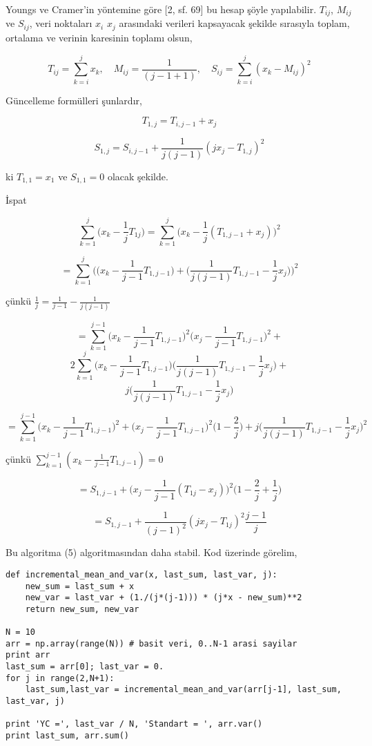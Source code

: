 \documentclass[12pt,fleqn]{article}\usepackage{../../common}
\begin{document}
Youngs ve Cramer'in yöntemine göre [2, sf. 69] bu hesap şöyle
yapılabilir. $T_{ij}$, $M_{ij}$ ve $S_{ij}$, veri noktaları $x_i$ $x_j$
arasındaki verileri kapsayacak şekilde sırasıyla toplam, ortalama ve verinin
karesinin toplamı olsun,

$$ 
T_{ij} = \sum _{k=i}^{j} x_k , \quad  
M_{ij} = \frac{1}{(j-1+1)}, \quad
S_{ij} = \sum _{k=i}^{j} (x_k - M_{ij})^2
$$

Güncelleme formülleri şunlardır, 

$$ T_{1,j} = T_{i,j-1} + x_j$$

$$ S_{1,j} = S_{i,j-1} + \frac{1}{j(j-1)} (jx_j - T_{1,j})^2  $$

ki $T_{1,1} = x_1$ ve $S_{1,1}=0$ olacak şekilde.

İspat

$$ 
\sum _{k=1}^{j} \bigg( x_k - \frac{1}{j} T_{1j} \bigg) = 
\sum _{k=1}^{j} \bigg( x_k - \frac{1}{j} (T_{1,j-1}+x_j)  \bigg)^2
$$

$$ = \sum _{k=1}^{j} \bigg(
\bigg(x_k - \frac{1}{j-1}T_{1,j-1} \bigg) + 
\bigg( \frac{1}{j(j-1)} T_{1,j-1} - \frac{1}{j} x_j\bigg) 
\bigg)^2
$$

çünkü $\frac{1}{j} = \frac{1}{j-1}-\frac{1}{j(j-1)}$


$$
= \sum _{k=1}^{j-1} \bigg( x_k - \frac{1}{j-1} T_{1,j-1} \bigg)^2  
 \bigg( x_j - \frac{1}{j-1} T_{1,j-1} \bigg)^2 +
$$
$$
2 \sum _{k=1}^{j}  \bigg( x_k - \frac{1}{j-1} T_{1,j-1} \bigg)
\bigg( \frac{1}{j(j-1)} T_{1,j-1} - \frac{1}{j} x_j \bigg) +
$$
$$
j \bigg( \frac{1}{j(j-1)} T_{1,j-1} - \frac{1}{j} x_j \bigg) 
$$

$$ 
= \sum _{k=1}^{j-1} \bigg( x_k - \frac{1}{j-1} T_{1,j-1} \bigg)^2 + 
\bigg( x_j - \frac{1}{j-1} T_{1,j-1} \bigg)^2 \bigg( 1-\frac{2}{j} \bigg) + 
j \bigg( \frac{1}{j(j-1)} T_{1,j-1} - \frac{1}{j}x_j \bigg)^2
$$

çünkü $\sum _{k=1}^{j-1} (x_k-\frac{1}{j-1} T_{1,j-1} )=0$

$$ 
= S_{1,j-1}  + \bigg( x_j - \frac{1}{j-1} (T_{1j}-x_j) \bigg) ^2
\bigg( 1-\frac{2}{j}+\frac{1}{j}\bigg)
$$

$$ = S_{1,j-1} + \frac{1}{(j-1)^2} (jx_j - T_{1j})^2 \frac{j-1}{j} $$

Bu algoritma (5) algoritmasından daha stabil. Kod üzerinde görelim,

\begin{verbatim}
def incremental_mean_and_var(x, last_sum, last_var, j):
    new_sum = last_sum + x
    new_var = last_var + (1./(j*(j-1))) * (j*x - new_sum)**2 
    return new_sum, new_var

N = 10
arr = np.array(range(N)) # basit veri, 0..N-1 arasi sayilar
print arr
last_sum = arr[0]; last_var = 0.
for j in range(2,N+1):
    last_sum,last_var = incremental_mean_and_var(arr[j-1], last_sum, last_var, j)

print 'YC =', last_var / N, 'Standart = ', arr.var()
print last_sum, arr.sum()
\end{verbatim}
\end{document}
